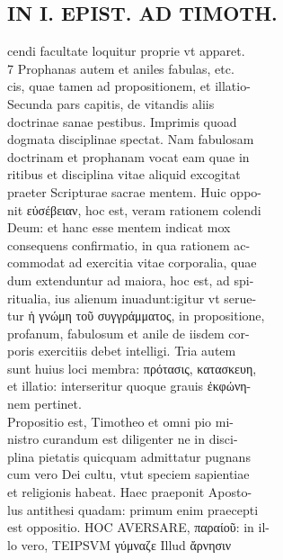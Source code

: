 \documentclass{article}
\begin{document}
\begin{pages}
\section*{IN I. EPIST. AD TIMOTH. \\
                }
cendi facultate loquitur proprie vt apparet. \\
                7 Prophanas autem et aniles fabulas, etc. \\
                cis, quae tamen ad propositionem, et illatio- \\
                Secunda pars capitis, de vitandis aliis \\
                doctrinae sanae pestibus. Imprimis quoad \\
                dogmata disciplinae spectat. Nam fabulosam \\
                doctrinam et prophanam vocat eam quae in \\
                ritibus et disciplina vitae aliquid excogitat \\
                praeter Scripturae sacrae mentem. Huic oppo- \\
                nit εὐσέβειαν, hoc est, veram rationem colendi \\
                Deum: et hanc esse mentem indicat mox \\
                consequens confirmatio, in qua rationem ac- \\
                commodat ad exercitia vitae corporalia, quae \\
                dum extenduntur ad maiora, hoc est, ad spi- \\
                ritualia, ius alienum inuadunt:igitur vt serue- \\
                tur ἡ γνώμη τοῦ συγγράμματος, in propositione, \\
                profanum, fabulosum et anile de iisdem cor- \\
                poris exercitiis debet intelligi. Tria autem \\
                sunt huius loci membra: πρότασις, κατασκευη, \\
                et illatio: interseritur quoque grauis ἐκφώνη- \\
                nem pertinet. \\
                Propositio est, Timotheo et omni pio mi- \\
                nistro curandum est diligenter ne in disci- \\
                plina pietatis quicquam admittatur pugnans \\
                cum vero Dei cultu, vtut speciem sapientiae \\
                et religionis habeat. Haec praeponit Aposto- \\
                lus antithesi quadam: primum enim praecepti \\
                est oppositio. HOC AVERSARE, παραίοῦ: in il- \\
                lo vero, TEIPSVM γύμναζε Illud ἄρνησιν \\
                

\end{pages}
\end{document}
